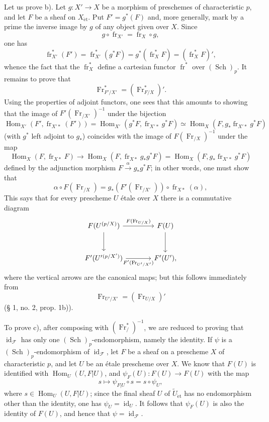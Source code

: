 \documentclass[11pt]{article}
\DeclareMathOperator{\Hom}{Hom}
\providecommand{\et}{\mathrm{\acute{e}t}}
\providecommand{\id}{\operatorname{id}}
\providecommand{\Hom}{\operatorname{Hom}}
\providecommand{\id}{\operatorname{id}}
\providecommand{\id}{\operatorname{id}}
\providecommand{\id}{\operatorname{id}}
\providecommand{\id}{\operatorname{id}}
\providecommand{\Hom}{\operatorname{Hom}}
\providecommand{\fr}{\operatorname{fr}}
\providecommand{\Fr}{\operatorname{Fr}}
\providecommand{\Sch}{\operatorname{Sch}}
\providecommand{\Fr}{\operatorname{Fr}}
\providecommand{\fr}{\operatorname{fr}}
\providecommand{\Sch}{\operatorname{Sch}}
\providecommand{\id}{\operatorname{id}}
\providecommand{\et}{\acute{e}t}
\begin{document}
Let us prove b). Let $g:X'\to X$ be a morphism of preschemes of characteristic $p$, and let $F$ be a sheaf on $X_{\et}$. Put $F'=g^*(F)$ and, more generally, mark by a prime the inverse image by $g$ of any object given over $X$. Since
\[
g\circ\fr_{X'}=\fr_X\circ g,
\]
one has
\[
\fr_{X'}^*(F')=\fr_{X'}^*(g^*F)=g^*(\fr_X^*F)=(\fr_X^*F)',
\]
whence the fact that the $\fr_X^*$ define a cartesian functor $\fr^*$ over $(\Sch)_p$. It remains to prove that
\[
\Fr^*_{F'/X'}=(\Fr^*_{F/X})'.
\]
Using the properties of adjoint functors, one sees that this amounts to showing that the image of $F'(\Fr_{/X'})^{-1}$ under the bijection
\[
\Hom_{X'}(F',\fr_{X'*}(F'))
 =\Hom_{X'}(g^*F,\fr_{X'*}g^*F)
 \simeq \Hom_X(F,g_*\fr_{X'*}g^*F)
\]
(with $g^*$ left adjoint to $g_*$) coincides with the image of $F(\Fr_{/X})^{-1}$ under the map
\[
\Hom_X(F,\fr_{X*}F)\longrightarrow
\Hom_X(F,\fr_{X*}g_*g^*F)=
\Hom_X(F,g_*\fr_{X'*}g^*F)
\]
defined by the adjunction morphism $F\xrightarrow{\alpha}g_*g^*F$; in other words, one must show that
\[
\alpha\circ F(\Fr_{/X})=g_*(F'(\Fr_{/X'}))\circ\fr_{X*}(\alpha),
\]
This says that for every prescheme $U$ étale over $X$ there is a commutative diagram
\[
\begin{tikzcd}[column sep=large,row sep=large]
F(U^{(p/X)}) \arrow[r,"F(\Fr_{U/X})"] \arrow[d]
& F(U) \arrow[d]\\
F'(U'{}^{(p/X')}) \arrow[r,"F'(\Fr_{U'/X'})"']
& F'(U') ,
\end{tikzcd}
\]
where the vertical arrows are the canonical maps; but this follows immediately from
\[
\Fr_{U'/X'}=(\Fr_{U/X})'
\]
(§ 1, no. 2, prop. 1b)).

To prove c), after composing with $(\Fr^*_{/})^{-1}$, we are reduced to proving that $\id_{\mathcal F}$ has only one $(\Sch)_p$-endomorphism, namely the identity. If $\psi$ is a $(\Sch)_p$-endomorphism of $\id_{\mathcal F}$, let $F$ be a sheaf on a prescheme $X$ of characteristic $p$, and let $U$ be an étale prescheme over $X$. We know that $F(U)$ is identified with $\Hom_U(U,F|U)$, and $\psi_F(U):F(U)\to F(U)$ with the map
\[
s\longmapsto \psi_{F|U}\circ s=s\circ\psi_U,
\]
where $s\in\Hom_U(U,F|U)$; since the final sheaf $U$ of $\widetilde U_{\et}$ has no endomorphism other than the identity, one has $\psi_U=\id_U$. It follows that $\psi_F(U)$ is also the identity of $F(U)$, and hence that $\psi=\id_{\mathcal F}$.
\end{document}
